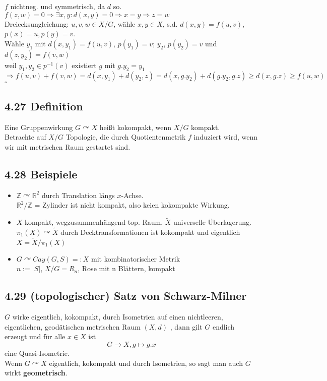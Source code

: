 \documentclass{article}
\newcommand{\df}[1]{\textbf{#1}\index{#1}}
\newcommand{\Z}{\mathbb{Z}}
\newcommand{\R}{\mathbb{R}}
\newcommand{\qed}{\hfill $\square$}
\begin{document}
$f$ nichtneg. und symmetrisch, da $d$ so.\\
$f(z,w) = 0 \Longrightarrow \exists x,y: d(x,y) = 0 \Longrightarrow x = y \Longrightarrow z = w$\\
Dreiecksungleichung: $u,v,w \in X/G$, wähle $x, y \in X$, s.d. $d(x,y) = f(u,v)$, $p(x) = u, p(y) = v$.\\
Wähle $y_1$ mit $d(x,y_1) = f(u,v)$, $p(y_1) = v$; $y_2$, $p(y_2) = v$ und $d(z,y_2) = f(v,w)$\\
weil $y_1, y_2 \in p^{-1}(v)$ existiert $g$ mit $g.y_2 =y_1$\\
$\Longrightarrow f(u,v) + f(v,w) = d(x,y_1)+d(y_2,z) = d(x,g.y_2) + d(g.y_2, g.z) \geq d(x,g.z) \geq f(u,w)$
\qed


\subsection{4.27 Definition}
Eine Gruppenwirkung $G\curvearrowright X$ heißt kokompakt, wenn $X/G$ kompakt.\\
Betrachte auf $X/G$ Topologie, die durch Quotientenmetrik $f$ induziert wird, wenn wir mit metrischen Raum gestartet sind.

\subsection{4.28 Beispiele}
\begin{itemize}
	\item $\Z \curvearrowright \R^2$ durch Translation längs $x$-Achse.\\
	$\R^2/\Z$ = Zylinder ist nicht kompakt, also keien kokompakte Wirkung.
	
	\item $X$ kompakt, wegzusammenhängend top. Raum, $\widetilde{X}$ universelle Überlagerung.\\
	$\pi_1(X) \curvearrowright \widetilde{X}$ durch Decktransformationen ist kokompakt und eigentlich\\
	$X = \widetilde{X}/ \pi_1(X)$
	
	\item $G \curvearrowright Cay(G,S) =: X$ mit kombinatorischer Metrik\\
	$n := |S|$, $X/G = R_n$, Rose mit n Blättern, kompakt
\end{itemize}

\subsection{4.29 (topologischer) Satz von Schwarz-Milner}
$G$ wirke eigentlich, kokompakt, durch Isometrien auf einen nichtleeren, eigentlichen, geodätischen metrischen Raum $(X,d)$
, dann gilt $G$ endlich erzeugt und für alle $x \in X$ ist
\[G \longrightarrow X, g \longmapsto g.x\]
eine Quasi-Isometrie.\\
Wenn $G\curvearrowright X$ eigentlich, kokompakt und durch Isometrien, so sagt man auch $G$ wirkt \df{geometrisch}.
\end{document}
